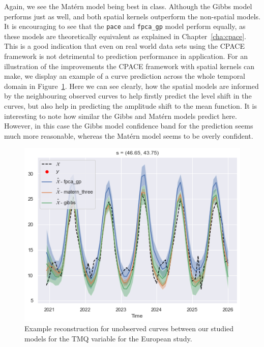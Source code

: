 Again, we see the Mat\'ern model being best in class.
Although the Gibbs model performs just as well, and both spatial kernels outperform the non-spatial models.
It is encouraging to see that the \verb*|pace| and \verb*|fpca_gp| model perform equally, as these models are theoretically equivalent as explained in Chapter~\ref{cha:cpace}.
This is a good indication that even on real world data sets using the CPACE framework is not detrimental to prediction performance in application.
For an illustration of the improvements the CPACE framework with spatial kernels can make, we display an example of a curve prediction across the whole temporal domain in Figure~\ref{fig:test_ex_tmq_eur}.
Here we can see clearly, how the spatial models are informed by the neighbouring observed curves to help firstly predict the level shift in the curves, but also help in predicting the amplitude shift to the mean function.
It is interesting to note how similar the Gibbs and Mat\'ern models predict here.
However, in this case the Gibbs model confidence band for the prediction seems much more reasonable, whereas the Mat\'ern model seems to be overly confident.

\begin{figure}
	\centering
	\includegraphics[width=\textwidth]{test_ex_tmq_eur}
	\caption{Example reconstruction for unobserved curves between our studied models for the TMQ variable for the European study.}
	\label{fig:test_ex_tmq_eur}
\end{figure}

